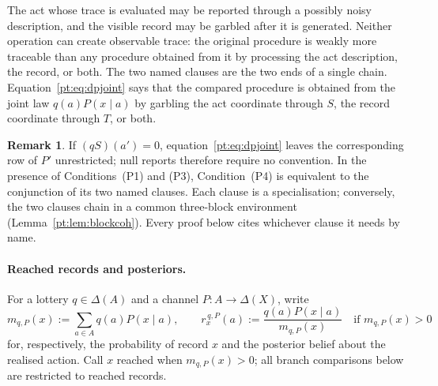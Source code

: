 \documentclass[11pt,a4paper]{article}
\theoremstyle{definition}
\newtheorem{remark}[theorem]{Remark}
\newcommand{\1}{\mathbf 1}
\begin{document}
\begin{description}[leftmargin=*,style=sameline]
The act whose trace is evaluated may be reported through a possibly noisy description, and the visible record may be
garbled after it is generated.  Neither operation can create observable trace: the original procedure is weakly more
traceable than any procedure obtained from it by processing the act description, the record, or both.  The two named
clauses are the two ends of a single chain.  Equation~\eqref{pt:eq:dpjoint} says that the compared procedure is obtained from
the joint law $q(a)P(x\mid a)$ by garbling the act coordinate through $S$, the record coordinate through $T$, or both.

\begin{remark}\label{pt:rem:dpform}
If $(qS)(a')=0$, equation~\eqref{pt:eq:dpjoint} leaves the corresponding row of $P'$ unrestricted; null reports therefore
require no convention.  In the presence of Conditions~\textup{(P1)} and \textup{(P3)}, Condition~\textup{(P4)} is equivalent
to the conjunction of its two named clauses.  Each clause is a specialisation; conversely, the two clauses chain in a
common three-block environment (Lemma~\ref{pt:lem:blockcoh}).  Every proof below cites whichever clause it needs by name.
\end{remark}

\end{description}

\paragraph{Reached records and posteriors.}
For a lottery $q\in\Delta(A)$ and a channel $P:A\to\Delta(X)$, write
\[
m_{q,P}(x):=\sum_{a\in A}q(a)P(x\mid a),
\qquad
r_x^{\,q,P}(a):=\frac{q(a)P(x\mid a)}{m_{q,P}(x)}
\quad\text{if }m_{q,P}(x)>0
\]
for, respectively, the probability of record $x$ and the posterior belief about the realised action.  Call $x$ reached
when $m_{q,P}(x)>0$; all branch comparisons below are restricted to reached records.
\end{document}
